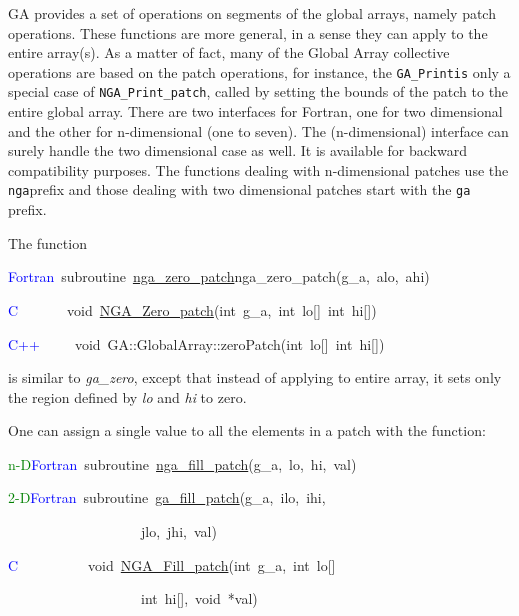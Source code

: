 GA provides a set of operations on segments of the global arrays,
namely patch operations. These functions are more general, in a sense
they can apply to the entire array(s). As a matter of fact, many of
the Global Array collective operations are based on the patch operations,
for instance, the \texttt{GA\_Printis} only a special case of \texttt{NGA\_Print\_patch},
called by setting the bounds of the patch to the entire global array.
There are two interfaces for Fortran, one for two dimensional and
the other for n-dimensional (one to seven). The (n-dimensional) interface
can surely handle the two dimensional case as well. It is available
for backward compatibility purposes. The functions dealing with n-dimensional
patches use the \textquotedbl{}\texttt{nga}\textquotedbl{}prefix and
those dealing with two dimensional patches start with the \textquotedbl{}\texttt{ga}\textquotedbl{}
prefix.

The function

\textcolor{blue}{Fortran}~subroutine~\href{https://hpc.pnl.gov/globalarrays/api/f_op_api.html\#ga_zero_patch}{nga\_{}zero\_{}patch}nga\_zero\_patch(g\_a,~alo,~ahi)~

\textcolor{blue}{C}~~~~~~~void~\href{https://hpc.pnl.gov/globalarrays/api/c_op_api.html\#ga_zero_patch}{NGA\_{}Zero\_{}patch}(int~g\_a,~int~lo{[}{]}~int~hi{[}{]})~

\textcolor{blue}{C++}~~~~~void~GA::GlobalArray::zeroPatch(int~lo{[}{]}~int~hi{[}{]})

is similar to \emph{ga\_zero}, except that instead of applying to
entire array, it sets only the region defined by \emph{lo} and \emph{hi}
to zero.

One can assign a single value to all the elements in a patch with
the function:

\textcolor{green}{n-D}\textcolor{blue}{Fortran}~subroutine~\href{https://hpc.pnl.gov/globalarrays/api/f_op_api.html\#ga_fill_patch}{nga\_{}fill\_{}patch}(g\_a,~lo,~hi,~val)~

\textcolor{green}{2-D}\textcolor{blue}{Fortran}~subroutine~\href{https://hpc.pnl.gov/globalarrays/api/f_op_api.html\#ga_fill_patch}{ga\_{}fill\_{}patch}(g\_a,~ilo,~ihi,~

~~~~~~~~~~~~~~~~~~~jlo,~jhi,~val)~

\textcolor{blue}{C}~~~~~~~~~~void~\href{https://hpc.pnl.gov/globalarrays/api/c_op_api.html\#ga_fill_patch}{NGA\_{}Fill\_{}patch}(int~g\_a,~int~lo{[}{]}~

~~~~~~~~~~~~~~~~~~~int~hi{[}{]},~void~{*}val)~

